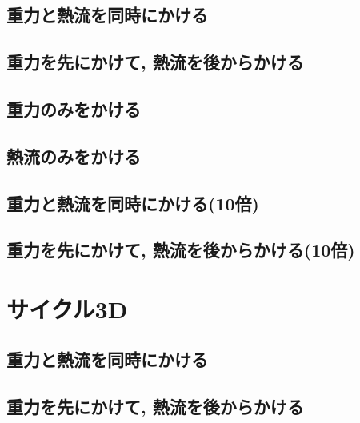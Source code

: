 \subsection{重力と熱流を同時にかける}



\subsection{重力を先にかけて, 熱流を後からかける}



\subsection{重力のみをかける}



\subsection{熱流のみをかける}



\subsection{重力と熱流を同時にかける(10倍)}



\subsection{重力を先にかけて, 熱流を後からかける(10倍)}




\section{サイクル3D}

\subsection{重力と熱流を同時にかける}



\subsection{重力を先にかけて, 熱流を後からかける}

